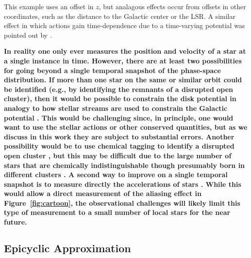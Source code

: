 \documentclass[twocolumn]{aastex62}
\begin{document}
This example uses an offset in $z$, but analagous effects occur from offsets
in other coordinates, such as the distance to the Galactic center or the LSR.
A similar effect in which actions gain time-dependence due to a time-varying
potential was pointed out by \citet{2015A&A...584A.120B}.

\textbf{In reality one only ever measures the
position and velocity of a star at a single instance in time. However, there are at least two possibilities for going beyond a single temporal snapshot of the phase-space distribution. If more than one star on the same
or similar orbit
     could be identified (e.g., by identifying the remnants of a disrupted open cluster), then it would be possible
to constrain the disk potential in analogy to how stellar streams are
used to constrain the Galactic  potential
\citep[e.g.][]{1999ApJ...512L.109J, 2001ApJ...551..294I, 
2004ApJ...610L..97H, 2015ApJ...801...98S, 2015ApJ...803...80K,
2019MNRAS.483.1427L}. This would be challenging since, in principle, one would want to use the stellar actions or other conserved quantities, but as we discuss in this
    work they are subject to substantial errors.  Another possibility would
    be to use
chemical tagging to identify a disrupted open cluster \citep{2002ARA&A..40..487F}, but
    this
may be difficult due to the large number of stars that are chemically
indistinguishable
    though
presumably born in different clusters
\citep{2018ApJ...853..198N}. A second way to improve on a single temporal snapshot is to measure directly the
accelerations of stars \citep{2018arXiv181207581S}. While this would allow a direct measurement of the aliasing effect in Figure~\ref{fig:cartoon}, the observational challenges will likely limit this type of measurement to a small number of local stars for the near future.}

\subsection{Epicyclic Approximation} \label{ssec:epi_action}
\end{document}
